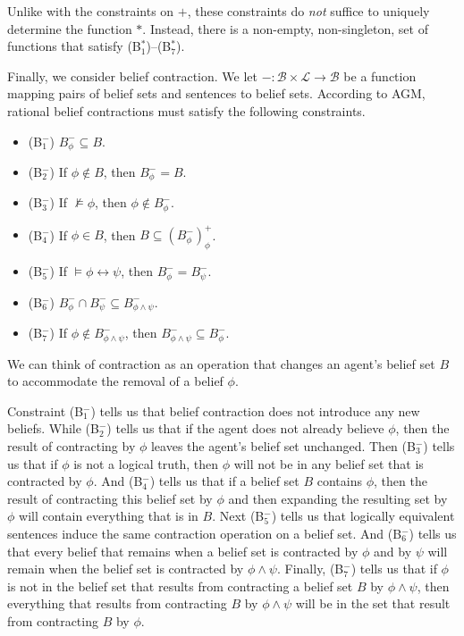 Unlike with the constraints on $+$, these constraints do \textit{not} suffice to uniquely determine the function $*$.
Instead, there is a non-empty, non-singleton, set of functions that satisfy (B$^*_1$)--(B$^*_7$).

Finally, we consider belief contraction.
We let $-: \mathcal{B} \times \mathcal{L} \rightarrow \mathcal{B}$ be a function mapping pairs of belief sets and sentences to belief sets.
According to AGM,  rational belief contractions must satisfy the following constraints.
\begin{itemize}
\item[](B$^-_1$) \quad $B^-_\phi \subseteq B$.
\item[](B$^-_2$) \quad If $\phi \not \in B$, then $B^-_\phi = B$.
\item[](B$^-_3$) \quad If $\not \models \phi$, then $\phi \not \in B^-_\phi$.
\item[](B$^-_4$) \quad If $\phi \in B$, then $B \subseteq (B^-_\phi)^+_\phi$.
\item[](B$^-_5$) \quad If $\models \phi \leftrightarrow \psi$, then $B^-_\phi = B^-_\psi$.
\item[](B$^-_6$) \quad $B^-_\phi \cap B^-_\psi \subseteq B^-_{\phi \wedge \psi}$.
\item[](B$^-_7$) \quad If $\phi \not \in B^-_{\phi \wedge \psi}$, then $B^-_{\phi \wedge \psi} \subseteq B^-_{\phi}$.
\end{itemize}

We can think of contraction as an operation that changes an agent's belief set $B$ to accommodate the removal of a belief $\phi$.

Constraint (B$^-_1$) tells us that belief contraction does not introduce any new beliefs.
While (B$^-_2$) tells us that if the agent does not already believe $\phi$, then the result of contracting by $\phi$ leaves the agent's belief set unchanged.
Then (B$^-_3$) tells us that if $\phi$ is not a logical truth, then $\phi$ will not be in any belief set that is contracted by $\phi$.
And (B$^-_4$) tells us that if a belief set $B$ contains $\phi$, then the result of contracting this belief set by $\phi$ and then expanding the resulting set by $\phi$ will contain everything that is in $B$.
Next (B$^-_5$) tells us that logically equivalent sentences induce the same contraction operation on a belief set.
And (B$^-_6$) tells us that every belief that remains when a belief set is contracted by $\phi$ and by $\psi$ will remain when the belief set is contracted by $\phi \wedge \psi$.
Finally, (B$^-_7$) tells us that if $\phi$ is not in the belief set that results from contracting a belief set $B$ by $\phi \wedge \psi$, then everything that results from contracting $B$ by $\phi \wedge \psi$ will be in the set that result from contracting $B$ by $\phi$.

